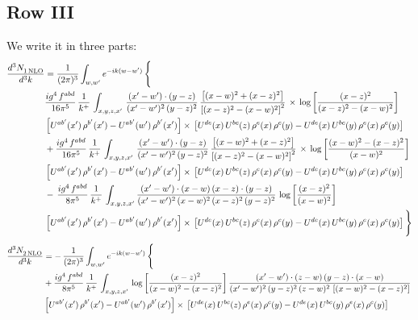 \documentclass[9pt]{article}
\numberwithin{equation}{section}
\begin{document}
\subsection{Row III}
{\color{orange}\sloppy{}\par
We write it in three parts:
\begin{align*}
   \frac{d^{3}N_{1\,\rm NLO}^{\rm}}{d^{3}k}  & =  \frac{1}{(2\pi)^{3}}  \int_{w, w^\prime} e^{-ik(w-w^\prime)}\, \Bigg\{\notag \\
& \frac{ig^{4}\,f^{abd}}{16\pi^{5}}\, \frac{1}{k^{+}}\,\int_{x,y,z,x'}\, \frac{(x'-w')\cdot (y-z)}{(x'-w')^{2}\,(y-z)^{2}}\, \frac{\left[(x-w)^{2}+(x-z)^{2}\right]}{\left[(x-z)^{2}-(x-w)^{2}\right]^{2}}\, \times\, \log{\left[\frac{(x-z)^{2}}{(x-z)^{2}-(x-w)^{2}}\right]}\notag \\ & \left[U^{ab'}(x')\,\rho^{b'}(x')-U^{ab'}(w')\, \rho^{b'}(x')\right]\times\, \left[U^{de}(x)\,U^{bc}(z)\, \rho^{e}(x)\,\rho^{c}(y)-U^{de}(x)\,U^{bc}(y)\,\rho^{e}(x)\,\rho^{c}(y)\right] \notag \\
&  +\frac{ig^{4}\,f^{abd}}{16\pi^{5}}\, \frac{1}{k^{+}}\,\int_{x,y,z,x'}\, \frac{(x'-w')\cdot (y-z)}{(x'-w')^{2}\,(y-z)^{2}}\, \frac{\left[(x-w)^{2}+(x-z)^{2}\right]}{\left[(x-z)^{2}-(x-w)^{2}\right]^{2}}\, \times\, \log{\left[\frac{(x-w)^{2}-(x-z)^{2}}{(x-w)^{2}}\right]}\notag \\ & \left[U^{ab'}(x')\,\rho^{b'}(x')-U^{ab'}(w')\, \rho^{b'}(x')\right]\times\, \left[U^{de}(x)\,U^{bc}(z)\, \rho^{e}(x)\,\rho^{c}(y)-U^{de}(x)\,U^{bc}(y)\,\rho^{e}(x)\,\rho^{c}(y)\right] \notag \\
&-\, \frac{ig^{4}\,f^{abd}}{8\pi^{5}}\,\frac{1}{k^{+}}\,\int_{x,y,z,x'}\frac{(x'-w')\cdot (x-w)\, (x-z)\cdot (y-z)}{(x'-w')^{2}\, (x-w)^{2}\, (x-z)^{2}\, (y-z)^{2}}\,\log{\left[\frac{(x-z)^{2}}{(x-w)^{2}}\right]} \notag \\ & \left[U^{ab'}(x')\,\rho^{b'}(x')-U^{ab'}(w')\, \rho^{b'}(x')\right]\times\, \left[U^{de}(x)\,U^{bc}(z)\, \rho^{e}(x)\,\rho^{c}(y)-U^{de}(x)\,U^{bc}(y)\,\rho^{e}(x)\,\rho^{c}(y)\right]\Bigg\}
\end{align*}
\begin{align*}
   \frac{d^{3}N_{2\,\rm NLO}^{\rm}}{d^{3}k}  & =  -\,\frac{1}{(2\pi)^{3}}  \int_{w, w^\prime} e^{-ik(w-w^\prime)}\, \Bigg\{\notag \\ &   + \frac{ig^{4}\, f^{abd}}{8\pi^{5}}\, \frac{1}{k^{+}}\, \int_{x,y,z,x'}\,\log{\left[\frac{(x-z)^{2}}{(x-w)^{2}-(x-z)^{2}}\right]}\,\frac{(x'-w')\cdot (z-w)\, (y-z)\cdot (x-w)}{(x'-w')^{2}\, (y-z)^{2}\, (z-w)^{2}\,\left[(x-w)^{2}-(x-z)^{2}\right]}\, \notag \\ & \left[U^{ab'}(x')\,\rho^{b'}(x')-U^{ab'}(w')\, \rho^{b'}(x')\right]\times\,\left[U^{de}(x)\,U^{bc}(z)\, \rho^{e}(x)\,\rho^{c}(y)-U^{de}(x)\,U^{bc}(y)\,\rho^{e}(x)\,\rho^{c}(y)\right] \notag \\

\end{align*}}
\end{document}
